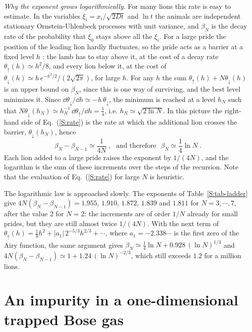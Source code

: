 \emph{Why the exponent grows logarithmically.} For many lions this rate is easy to estimate. In the variables $\xi_i = x_i/\sqrt{2 D t}$ and $\ln t$ the animals are independent stationary Ornstein-Uhlenbeck processes with unit variance, and $\beta_N$ is the decay rate of the probability that $\xi_0$ stays above all the $\xi_i$. For a large pride the position of the leading lion hardly fluctuates, so the pride acts as a barrier at a fixed level $h$ \cite{KR96}: the lamb has to stay above it, at the cost of a decay rate $\theta_\uparrow(h) \simeq h^2/8$, and every lion below it, at the cost of $\theta_\downarrow(h) \simeq h \, e^{-h^2/2}/(2 \sqrt{2\pi})$, for large $h$. For any $h$ the sum $\theta_\uparrow(h) + N \theta_\downarrow(h)$ is an upper bound on $\beta_N$, since this is one way of surviving, and the best level minimizes it. Since $\dd \theta_\downarrow/\dd h \simeq - h \, \theta_\downarrow$, the minimum is reached at a level $h_N$ such that $N \theta_\downarrow(h_N) \simeq h_N^{-1} \, \dd \theta_\uparrow/\dd h = \frac{1}{4}$, i.e. $h_N \simeq \sqrt{2 \ln N}$. In this picture the right-hand side of Eq.~(\ref{S:rate}) is the rate at which the additional lion crosses the barrier, $\theta_\downarrow(h_N)$, hence
\begin{equation} \label{S:logN}
    \beta_N - \beta_{N-1} \simeq \frac{1}{4N} \;, \mbox{~~and therefore~~} \beta_N \simeq \frac{1}{4} \ln N \;.
\end{equation}
Each lion added to a large pride raises the exponent by $1/(4N)$, and the logarithm is the sum of these increments over the steps of the recursion. Note that the evaluation of Eq.~(\ref{S:rate}) for large $N$ is heuristic.

The logarithmic law is approached slowly. The exponents of Table~\ref{S:tab-ladder} give $4N (\beta_N - \beta_{N-1}) = 1.955$, $1.910$, $1.872$, $1.839$ and $1.811$ for $N = 3, \cdots, 7$, after the value $2$ for $N = 2$: the increments are of order $1/N$ already for small prides, but they are still almost twice $1/(4N)$. With the next term of $\theta_\uparrow(h) = \frac{1}{8} h^2 + |a_1| \, 2^{-5/3} h^{2/3} + \cdots$, where $a_1 = -2.338 \cdots$ is the first zero of the Airy function, the same argument gives $\beta_N \simeq \frac{1}{4} \ln N + 0.928 \, (\ln N)^{1/3}$ and $4N (\beta_N - \beta_{N-1}) \simeq 1 + 1.24 \, (\ln N)^{-2/3}$, which still exceeds $1.2$ for a million lions.

\section{An impurity in a one-dimensional trapped Bose gas} \label{S:sec-impurity}

